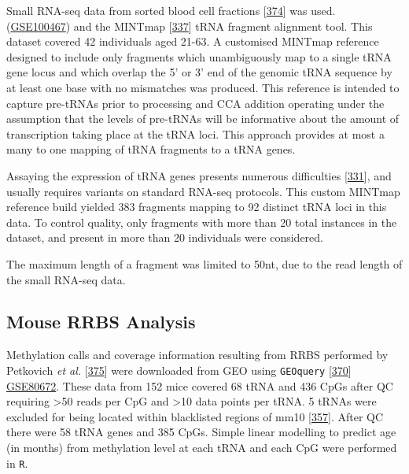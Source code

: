 \documentclass[
]{book}
\begin{document}
Small RNA-seq data from sorted blood cell fractions {[}\protect\hyperlink{ref-Juzenas2017}{374}{]} was used. (\href{https://www.ncbi.nlm.nih.gov/geo/query/acc.cgi?acc=GSE100467}{GSE100467}) and the MINTmap {[}\protect\hyperlink{ref-Loher2017}{337}{]} tRNA fragment alignment tool.
This dataset covered 42 individuals aged 21-63.
A customised MINTmap reference designed to include only fragments which unambiguously map to a single tRNA gene locus and which overlap the 5' or 3' end of the genomic tRNA sequence by at least one base with no mismatches was produced.
This reference is intended to capture pre-tRNAs prior to processing and CCA addition operating under the assumption that the levels of pre-tRNAs will be informative about the amount of transcription taking place at the tRNA loci.
This approach provides at most a many to one mapping of tRNA fragments to a tRNA genes.

Assaying the expression of tRNA genes presents numerous difficulties {[}\protect\hyperlink{ref-Torres2019}{331}{]}, and usually requires variants on standard RNA-seq protocols.
This custom MINTmap reference build yielded 383 fragments mapping to 92 distinct tRNA loci in this data.
To control quality, only fragments with more than 20 total instances in the dataset, and present in more than 20 individuals were considered.

The maximum length of a fragment was limited to 50nt, due to the read length of the small RNA-seq data.

\hypertarget{mousemethods}{%
\subsection{Mouse RRBS Analysis}\label{mousemethods}}

Methylation calls and coverage information resulting from RRBS performed by Petkovich \emph{et al.} {[}\protect\hyperlink{ref-Petkovich2017}{375}{]} were downloaded from GEO using \texttt{GEOquery} {[}\protect\hyperlink{ref-Davis2007p}{370}{]} \href{https://www.ncbi.nlm.nih.gov/geo/query/acc.cgi?acc=GSE80672}{GSE80672}.
These data from 152 mice covered 68 tRNA and 436 CpGs after QC requiring \textgreater50 reads per CpG and \textgreater10 data points per tRNA.
5 tRNAs were excluded for being located within blacklisted regions of mm10 {[}\protect\hyperlink{ref-Amemiya2019}{357}{]}.
After QC there were 58 tRNA genes and 385 CpGs.
Simple linear modelling to predict age (in months) from methylation level at each tRNA and each CpG were performed in \texttt{R}.
\end{document}
